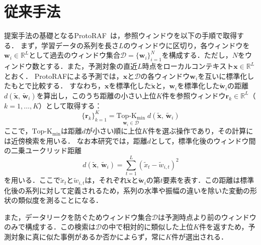 \documentclass[twocolumn, lastpage]{jarticle}
\newif\ifrevmark
\newcommand{\revAblock}[1]{\ifrevmark{\color{blue}#1}\else#1\fi}
\begin{document}
\section{従来手法}
提案手法の基礎となるProtoRAF~\cite{Tire.2024}は，参照ウィンドウを以下の手順で取得する．
まず，学習データの系列を長さ$L$のウィンドウに区切り，各ウィンドウを$\bm{w}_i \in \mathbb{R}^{L}$として過去のウィンドウ集合$\mathcal{D} = \{\bm{w}_i\}_{i=1}^{N}$を構成する．ただし，$N$をウィンドウ数とする．また，予測対象の直近$L$時点をローカルコンテキスト$\bm{x} \in \mathbb{R}^{L}$とおく．
ProtoRAFによる予測では，$\bm{x}$と$\mathcal{D}$の各ウィンドウ$\bm{w}_i$を互いに標準化したもとで比較する．
すなわち，$\bm{x}$を標準化した$\tilde{\bm{x}}$と，$\bm{w}_i$を標準化した$\tilde{\bm{w}}_i$の距離$d(\tilde{\bm{x}},\, \tilde{\bm{w}}_i)$を算出し，このうち距離の小さい上位$K$件を参照ウィンドウ$\bm{r}_k \in \mathbb{R}^{L}$（$k = 1, \dots, K$）として取得する：
    \begin{equation}
        \{\bm{r}_k\}_{k=1}^{K}
        = \operatorname*{Top\text{-}K_{\mathrm{min}}}_{\bm{w}_i \in \mathcal{D}}\;
        d(\tilde{\bm{x}},\, \tilde{\bm{w}}_i)
    \end{equation}
ここで，$\operatorname{Top\text{-}K_{\mathrm{min}}}$は距離$d$が小さい順に上位$K$件を選ぶ操作であり，その計算には近傍検索を用いる．
\revAblock{なお本研究では，距離$d$として，標準化後のウィンドウ間の二乗ユークリッド距離
    \begin{equation}\label{eq:distance}
        d(\tilde{\bm{x}},\, \tilde{\bm{w}}_i)
        = \sum_{t=1}^{L} \left( \tilde{x}_t - \tilde{w}_{i,t} \right)^{2}
    \end{equation}
を用いる．ここで$\tilde{x}_t$と$\tilde{w}_{i,t}$は，それぞれ$\tilde{\bm{x}}$と$\tilde{\bm{w}}_i$の第$t$要素を表す．この距離は標準化後の系列に対して定義されるため，系列の水準や振幅の違いを除いた変動の形状の類似度を測ることになる．}

また，データリークを防ぐためウィンドウ集合$\mathcal{D}$は予測時点より前のウィンドウのみで構成する．この検索は$\mathcal{D}$の中で相対的に類似した上位$K$件を返すため，予測対象に真に似た事例があるか否かによらず，常に$K$件が選出される．
\end{document}
